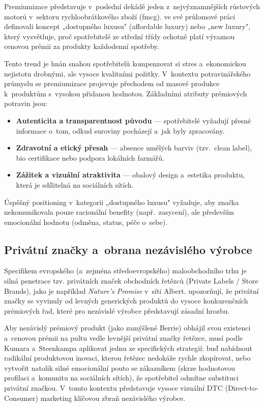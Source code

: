 Premiumizace představuje v~poslední dekádě jeden z~nejvýznamnějších růstových motorů v~sektoru rychloobrátkového zboží (\gls{fmcg}). \textcite{silverstein_2003} ve své průlomové práci definovali koncept „dostupného luxusu" (affordable luxury) nebo „new luxury", který vysvětluje, proč spotřebitelé ze střední třídy ochotně platí výraznou cenovou prémii za produkty každodenní spotřeby. 

Tento trend je hnán snahou spotřebitelů kompenzovat si stres a~ekonomickou nejistotu drobnými, ale vysoce kvalitními požitky. V~kontextu potravinářského průmyslu se premiumizace projevuje přechodem od masové produkce k~produktům s~vysokou přidanou hodnotou. Základními atributy prémiových potravin jsou:
\begin{itemize}
  \item \textbf{Autenticita a transparentnost původu} — spotřebitelé vyžadují přesné informace o~tom, odkud suroviny pocházejí a~jak byly zpracovány.
  \item \textbf{Zdravotní a etický přesah} — absence umělých barviv (tzv.\ clean label), \gls{bio} certifikace nebo podpora lokálních farmářů.
  \item \textbf{Zážitek a vizuální atraktivita} — obalový design a~estetika produktu, která je sdílitelná na sociálních sítích.
\end{itemize}

Úspěšný positioning v~kategorii „dostupného luxusu" vyžaduje, aby značka nekomunikovala pouze racionální benefity (např.\ zasycení), ale především emocionální hodnotu (odměna, status, péče o~sebe).

\subsection{Privátní značky a~obrana nezávislého výrobce}
\label{subsec:theory_private_labels}

Specifikem evropského (a~zejména středoevropského) maloobchodního trhu je silná penetrace tzv. privátních značek obchodních řetězců (Private Labels / Store Brands), jako je například \textit{Nature's Promise} v~síti Albert. \textcite{kumar_steenkamp_2007} upozorňují, že privátní značky se vyvinuly od levných generických produktů do vysoce konkurenčních prémiových řad, které pro nezávislé výrobce představují zásadní hrozbu.

Aby nezávislý prémiový produkt (jako zamýšlené Berrie) obhájil svou existenci a~cenovou prémii na pultu vedle levnější privátní značky řetězce, musí podle Kumara a~Steenkampa aplikovat jednu ze specifických strategií: buď nabídnout radikální produktovou inovaci, kterou řetězec nedokáže rychle zkopírovat, nebo vytvořit natolik silné emocionální pouto se zákazníkem (skrze hodnotovou profilaci a~komunitu na sociálních sítích), že spotřebitel odmítne substituci privátní značkou. V~tomto kontextu představuje vysoce vizuální DTC (Direct-to-Consumer) marketing klíčovou zbraň nezávislého výrobce.

